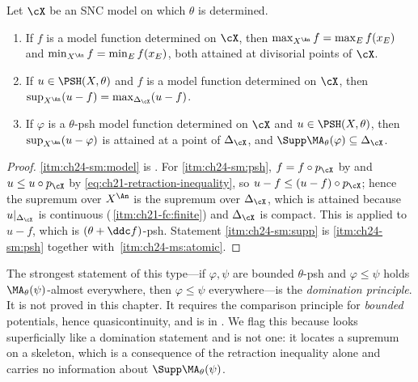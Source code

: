 \begin{proposition}
\label{prop:ch24-skeletal-maximum}
Let \(\cX\) be an SNC model on which \(\theta\) is determined.
\begin{enumerate}
\item\label{itm:ch24-sm:model} If \(f\) is a model function determined on
 \(\cX\), then \(\max_{X^{\An}}f=\max_{E}f(x_E)\) and
 \(\min_{X^{\An}}f=\min_Ef(x_E)\), both attained at divisorial points of
 \(\cX\).
\item\label{itm:ch24-sm:psh} If \(u\in\PSH(X,\theta)\) and \(f\) is a model
 function determined on \(\cX\), then
 \(\sup_{X^{\An}}(u-f)=\max_{\Delta_{\cX}}(u-f)\).
\item\label{itm:ch24-sm:supp} If \(\varphi\) is a \(\theta\)-psh model
 function determined on \(\cX\) and \(u\in\PSH(X,\theta)\), then
 \(\sup_{X^{\An}}(u-\varphi)\) is attained at a point of \(\Delta_{\cX}\),
 and \(\Supp\MA_\theta(\varphi)\subseteq\Delta_{\cX}\).
\end{enumerate}
\end{proposition}

\begin{proof}
\cref{itm:ch24-sm:model} is .  For
\cref{itm:ch24-sm:psh}, \(f=f\circ p_{\cX}\) by
 and \(u\leq u\circ p_{\cX}\) by
\eqref{eq:ch21-retraction-inequality}, so
\(u-f\leq(u-f)\circ p_{\cX}\); hence the supremum over \(X^{\An}\) is the
supremum over \(\Delta_{\cX}\), which is attained because
\(u|_{\Delta_{\cX}}\) is continuous
(\,\cref{itm:ch21-fc:finite}) and
\(\Delta_{\cX}\) is compact.  This is
 applied to \(u-f\), which is
\((\theta+\ddc f)\)-psh.  Statement \cref{itm:ch24-sm:supp} is
\cref{itm:ch24-sm:psh} together with
\,\cref{itm:ch24-ms:atomic}.
\end{proof}

\begin{remark}
\label{rem:ch24-domination-scope}
The strongest statement of this type---if \(\varphi,\psi\) are bounded
\(\theta\)-psh and \(\varphi\leq\psi\) holds
\(\MA_\theta(\psi)\)-almost everywhere, then \(\varphi\leq\psi\)
everywhere---is the \emph{domination principle}.  It is not proved in this
chapter.  It requires the comparison principle for \emph{bounded}
potentials, hence quasicontinuity, and is
 in .  We
flag this because  looks superficially like
a domination statement and is not one: it locates a supremum on a skeleton,
which is a consequence of the retraction inequality alone and carries no
information about \(\Supp\MA_\theta(\psi)\).
\end{remark}

